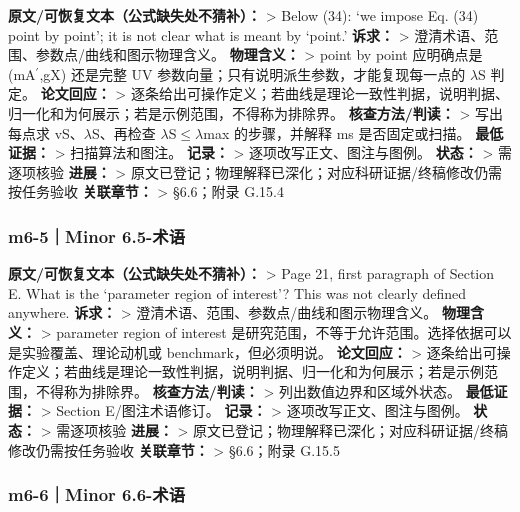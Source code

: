 \documentclass[
  chinese,
  UTF8]{ctexart}
\begin{document}
\textbf{原文/可恢复文本（公式缺失处不猜补）：} \textgreater{} Below
(34): `we impose Eq. (34) point by point'; it is not clear what is meant
by `point.' \textbf{诉求：} \textgreater{}
澄清术语、范围、参数点/曲线和图示物理含义。 \textbf{物理含义：}
\textgreater{} point by point 应明确点是 (mA\ensuremath{^\prime},gX)
还是完整 UV 参数向量；只有说明派生参数，才能复现每一点的
\ensuremath{\lambda}S 判定。 \textbf{论文回应：} \textgreater{}
逐条给出可操作定义；若曲线是理论一致性判据，说明判据、归一化和为何展示；若是示例范围，不得称为排除界。
\textbf{核查方法/判读：} \textgreater{} 写出每点求
vS、\ensuremath{\lambda}S、再检查
\ensuremath{\lambda}S\ensuremath{\leq}\ensuremath{\lambda}max
的步骤，并解释 ms 是否固定或扫描。 \textbf{最低证据：} \textgreater{}
扫描算法和图注。 \textbf{记录：} \textgreater{}
逐项改写正文、图注与图例。 \textbf{状态：} \textgreater{} 需逐项核验
\textbf{进展：} \textgreater{}
原文已登记；物理解释已深化；对应科研证据/终稿修改仍需按任务验收
\textbf{关联章节：} \textgreater{} §6.6；附录 G.15.4

\subsubsection{m6-5｜Minor 6.5-术语}\label{m6-5minor-6.5-ux672fux8bed}

\textbf{原文/可恢复文本（公式缺失处不猜补）：} \textgreater{} Page 21,
first paragraph of Section E. What is the `parameter region of
interest'? This was not clearly defined anywhere. \textbf{诉求：}
\textgreater{} 澄清术语、范围、参数点/曲线和图示物理含义。
\textbf{物理含义：} \textgreater{} parameter region of interest
是研究范围，不等于允许范围。选择依据可以是实验覆盖、理论动机或
benchmark，但必须明说。 \textbf{论文回应：} \textgreater{}
逐条给出可操作定义；若曲线是理论一致性判据，说明判据、归一化和为何展示；若是示例范围，不得称为排除界。
\textbf{核查方法/判读：} \textgreater{} 列出数值边界和区域外状态。
\textbf{最低证据：} \textgreater{} Section E/图注术语修订。
\textbf{记录：} \textgreater{} 逐项改写正文、图注与图例。
\textbf{状态：} \textgreater{} 需逐项核验 \textbf{进展：} \textgreater{}
原文已登记；物理解释已深化；对应科研证据/终稿修改仍需按任务验收
\textbf{关联章节：} \textgreater{} §6.6；附录 G.15.5

\subsubsection{m6-6｜Minor 6.6-术语}\label{m6-6minor-6.6-ux672fux8bed}
\end{document}
